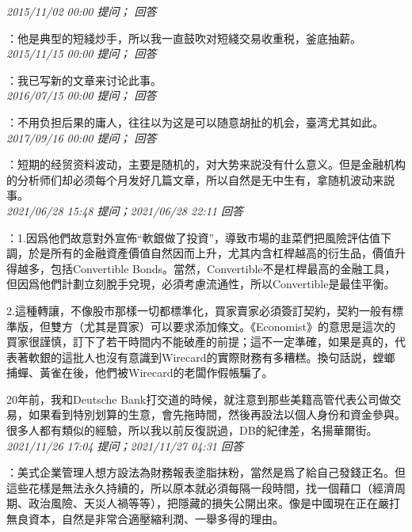\documentclass[twocolumn]{ctexart}
\begin{document}
\textit{\hfill\noindent\small 2015/11/02 00:00 提问； 回答}

：他是典型的短綫炒手，所以我一直鼓吹对短綫交易收重税，釜底抽薪。\\

\textit{\hfill\noindent\small 2015/11/15 00:00 提问； 回答}

：我已写新的文章来讨论此事。\\

\textit{\hfill\noindent\small 2016/07/15 00:00 提问； 回答}

：不用负担后果的庸人，往往以为这是可以随意胡扯的机会，臺湾尤其如此。\\

\textit{\hfill\noindent\small 2017/09/16 00:00 提问； 回答}

：短期的经贸资料波动，主要是随机的，对大势来説没有什么意义。但是金融机构的分析师们却必须每个月发好几篇文章，所以自然是无中生有，拿随机波动来説事。\\

\textit{\hfill\noindent\small 2021/06/28 15:48 提问；2021/06/28 22:11 回答}

：1.因爲他們故意對外宣佈“軟銀做了投資”，導致市場的韭菜們把風險評估值下調，於是所有的金融資產價值自然因而上升，尤其内含杠桿越高的衍生品，價值升得越多，包括Convertible Bonds。當然，Convertible不是杠桿最高的金融工具，但因爲他們計劃立刻脫手兌現，必須考慮流通性，所以Convertible是最佳平衡。

2.這種轉讓，不像股市那樣一切都標準化，買家賣家必須簽訂契約，契約一般有標準版，但雙方（尤其是買家）可以要求添加條文。《Economist》的意思是這次的買家很謹慎，訂下了若干時間内不能破產的前提；這不一定準確，如果是真的，代表著軟銀的這批人也沒有意識到Wirecard的實際財務有多糟糕。換句話説，螳螂捕蟬、黃雀在後，他們被Wirecard的老闆作假帳騙了。

20年前，我和Deutsche Bank打交道的時候，就注意到那些美籍高管代表公司做交易，如果看到特別划算的生意，會先拖時間，然後再設法以個人身份和資金參與。很多人都有類似的經驗，所以我以前反復説過，DB的紀律差，名揚華爾街。
\\

\textit{\hfill\noindent\small 2021/11/26 17:04 提问；2021/11/27 04:31 回答}

：美式企業管理人想方設法為財務報表塗脂抹粉，當然是爲了給自己發錢正名。但這些花樣是無法永久持續的，所以原本就必須每隔一段時間，找一個藉口（經濟周期、政治風險、天災人禍等等），把隱藏的損失公開出來。像是中國現在正在嚴打無良資本，自然是非常合適壓縮利潤、一舉多得的理由。
\\
\end{document}
